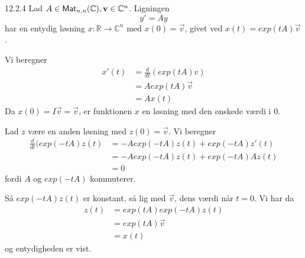 \begin{korollar}{12.2.4}
	Lad $A \in \textsf{Mat}_{n,n}(\mathbb{C}), \mathbf{v} \in \mathbb{C}^n$. Ligningen
	\[
		y' = Ay
	\]	
	har en entydig løsning $x: \mathbb{R} \rightarrow \mathbb{C}^n$ med 
	$x(0) = \vec{v}$, givet ved $x(t) = exp(tA)\vec{v}$.

\end{korollar}

\begin{bevis}
	Vi beregner
	\begin{align*}	
		x'(t) &= \frac{d}{dt}(exp(tA)v) \\
		&= A exp(tA)\vec{v} \\
		&= A x(t)
	\end{align*}
	Da $x(0) = I\vec{v} = \vec{v}$, er funktionen $x$ en løsning med den 
	ønskede værdi i 0.

	Lad $z$ være en anden løsning med $z(0) = \vec{v}$. Vi beregner
	\begin{align*}
		\frac{d}{dt}(exp(-tA)z(t) &= -A exp(-tA)z(t) + exp(-tA)z'(t) \\
		&= -A exp(-tA)z(t) + exp(-tA)Az(t) \\
		&= 0
	\end{align*}
	fordi $A$ og $exp(-tA)$ kommuterer.
	
	Så $exp(-tA)z(t)$ er konstant, så lig med $\vec{v}$, dens værdi når 
	$t = 0$. Vi har da
	\begin{align*}
		z(t) &= exp(tA)exp(-tA)z(t) \\
		&= exp(tA)\vec{v} \\
		&= x(t)
	\end{align*}
	og entydigheden er vist.
\end{bevis}
